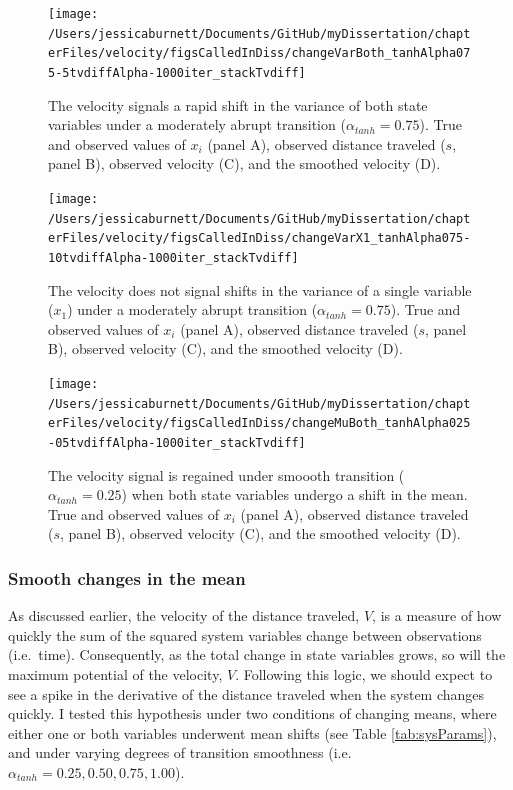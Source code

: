 \documentclass[12pt,twoside,openany]{reedthesis}
\begin{document}
\newpage
\begin{figure}
\texttt{[image: /Users/jessicaburnett/Documents/GitHub/myDissertation/chapterFiles/velocity/figsCalledInDiss/changeVarBoth\_tanhAlpha075-5tvdiffAlpha-1000iter\_stackTvdiff]} \caption{The velocity signals a rapid shift in the variance of both state variables under a moderately abrupt transition ($\alpha_{tanh}=0.75$). True and observed values of $x_i$ (panel A), observed distance traveled ($s$, panel B), observed velocity (C), and the smoothed velocity (D). }\label{fig:varBoth}
\end{figure}
\newpage
\begin{figure}
\texttt{[image: /Users/jessicaburnett/Documents/GitHub/myDissertation/chapterFiles/velocity/figsCalledInDiss/changeVarX1\_tanhAlpha075-10tvdiffAlpha-1000iter\_stackTvdiff]} \caption{The velocity does not signal shifts in the variance of a single variable ($x_1$) under a moderately abrupt transition ($\alpha_{tanh}=0.75$). True and observed values of $x_i$ (panel A), observed distance traveled ($s$, panel B), observed velocity (C), and the smoothed velocity (D). }\label{fig:var1}
\end{figure}
\newpage
\begin{figure}
\texttt{[image: /Users/jessicaburnett/Documents/GitHub/myDissertation/chapterFiles/velocity/figsCalledInDiss/changeMuBoth\_tanhAlpha025-05tvdiffAlpha-1000iter\_stackTvdiff]} \caption{The velocity signal is regained under smoooth transition ($\alpha_{tanh}=0.25$) when both state variables undergo a shift in the mean. True and observed values of $x_i$ (panel A), observed distance traveled ($s$, panel B), observed velocity (C), and the smoothed velocity (D). }\label{fig:muBoth25}
\end{figure}
\hypertarget{smooth-changes-in-the-mean}{%
\subsubsection{Smooth changes in the mean}\label{smooth-changes-in-the-mean}}

As discussed earlier, the velocity of the distance traveled, \(V\), is a measure of how quickly the sum of the squared system variables change between observations (i.e.~time). Consequently, as the total change in state variables grows, so will the maximum potential of the velocity, \(V\). Following this logic, we should expect to see a spike in the derivative of the distance traveled when the system changes quickly. I tested this hypothesis under two conditions of changing means, where either one or both variables underwent mean shifts (see Table \ref{tab:sysParams}), and under varying degrees of transition smoothness (i.e.~\(\alpha_{tanh}={0.25, 0.50, 0.75, 1.00}\)).
\end{document}
